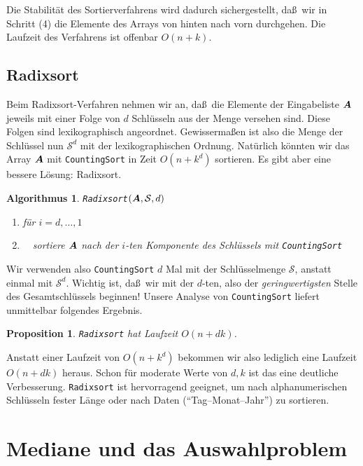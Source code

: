 \documentclass[10pt,reqno]{amsart}
\numberwithin{equation}{section}
\newcommand\cS{\mathcal S}
\newcommand\vA{\vec A}
\def\vec#1{\mathchoice{\mbox{\boldmath$\displaystyle#1$}}
{\mbox{\boldmath$\textstyle#1$}}
{\mbox{\boldmath$\scriptstyle#1$}}
{\mbox{\boldmath$\scriptscriptstyle#1$}}}
\newtheorem{proposition}[definition]{Proposition}
\newtheorem{algorithm}[definition]{Algorithmus}
\begin{document}
Die Stabilit\"at des Sortierverfahrens wird dadurch sichergestellt, da\ss\ wir in Schritt (4) die Elemente des Arrays von hinten nach vorn durchgehen.
Die Laufzeit des Verfahrens ist offenbar $O(n+k)$.

\subsection{Radixsort}\label{sec_radixsort}
Beim Radixsort-Verfahren nehmen wir an, da\ss\ die Elemente der Eingabeliste $\vA$ jeweils mit einer Folge von $d$ Schl\"usseln aus der Menge versehen sind.
Diese Folgen sind lexikographisch angeordnet.
Gewisserma\ss en ist also die Menge der Schl\"ussel nun $\cS^d$ mit der lexikographischen Ordnung.
Nat\"urlich k\"onnten wir das Array $\vA$ mit {\tt CountingSort} in Zeit $O(n+k^d)$ sortieren.
Es gibt aber eine bessere L\"osung: Radixsort.

\begin{algorithm}{\tt Radixsort$(\vA,\cS,d)$}
	\begin{enumerate}
		\item f\"ur $i=d,\ldots,1$
		\item $\quad$sortiere $\vA$ nach der $i$-ten Komponente des Schl\"ussels mit {\tt CountingSort}
	\end{enumerate}
\end{algorithm}

Wir verwenden also {\tt CountingSort} $d$ Mal mit der Schl\"usselmenge $\cS$, anstatt einmal mit $\cS^d$.
Wichtig ist, da\ss\ wir mit der $d$-ten, also der {\em geringwertigsten} Stelle des Gesamtschl\"ussels beginnen!
Unsere Analyse von {\tt CountingSort} liefert unmittelbar folgendes Ergebnis.

\begin{proposition}\label{prop_radix}
	{\tt Radixsort} hat Laufzeit $O(n+dk)$.
\end{proposition}

Anstatt einer Laufzeit von $O(n+k^d)$ bekommen wir also lediglich eine Laufzeit $O(n+dk)$ heraus.
Schon f\"ur moderate Werte von $d,k$ ist das eine deutliche Verbesserung.
{\tt Radixsort} ist hervorragend geeignet, um nach alphanumerischen Schl\"usseln fester L\"ange oder nach Daten (``Tag--Monat--Jahr'') zu sortieren.

\section{Mediane und das Auswahlproblem}\label{sec_select}
\end{document}
